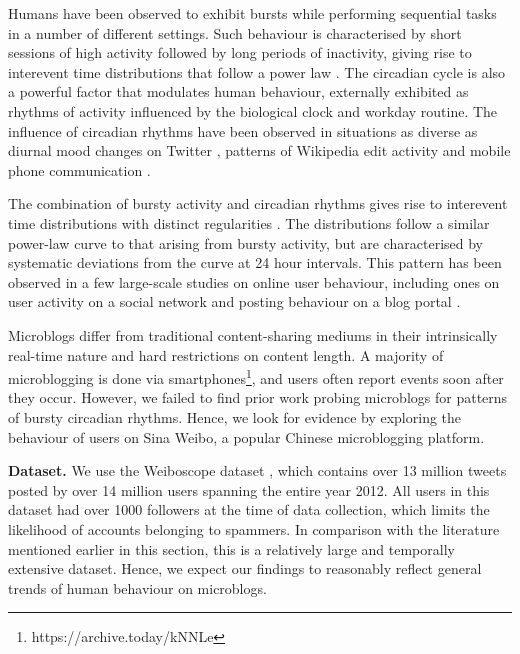 \documentclass[onecolumn, 12 pt, doublespace, fullpage, letterpaper]{report}
\begin{document}
Humans have been observed to exhibit bursts while performing sequential tasks in a number of different settings. Such behaviour is characterised by short sessions of high activity followed by long periods of inactivity, giving rise to interevent time distributions that follow a power law \cite{barabasi2005bursts}. The circadian cycle is also a powerful factor that modulates human behaviour, externally exhibited as rhythms of activity influenced by the biological clock and workday routine. The influence of circadian rhythms have been observed in situations as diverse as diurnal mood changes on Twitter \cite{golder2011diurnal}, patterns of Wikipedia edit activity \cite{yasseri2012circadian} and mobile phone communication \cite{jo2012circadian}.

The combination of bursty activity and circadian rhythms gives rise to interevent time distributions with distinct regularities \cite{malmgren2008circadian}. The distributions follow a similar power-law curve to that arising from bursty activity, but are characterised by systematic deviations from the curve at 24 hour intervals. This pattern has been observed in a few large-scale studies on online user behaviour, including ones on user activity on a social network \cite{chun2008comparison} and posting behaviour on a blog portal \cite{kim2013microscopic}.

Microblogs differ from traditional content-sharing mediums in their intrinsically real-time nature and hard restrictions on content length. A majority of microblogging is done via smartphones\footnote{https://archive.today/kNNLe}, and users often report events soon after they occur. However, we failed to find prior work probing microblogs for patterns of bursty circadian rhythms. Hence, we look for evidence by exploring the behaviour of users on Sina Weibo, a popular Chinese microblogging platform.

\textbf{Dataset.} We use the Weiboscope dataset \cite{fu2013assessing}, which contains over 13 million tweets posted by over 14 million users spanning the entire year 2012. All users in this dataset had over 1000 followers at the time of data collection, which limits the likelihood of accounts belonging to spammers. In comparison with the literature mentioned earlier in this section, this is a relatively large and temporally extensive dataset. Hence, we expect our findings to reasonably reflect general trends of human behaviour on microblogs.
\end{document}
